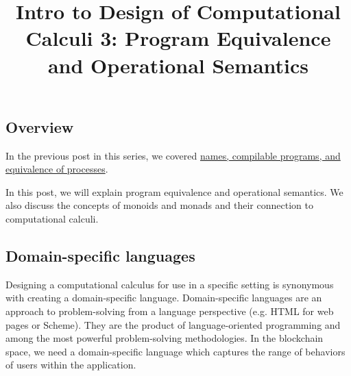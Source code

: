 \documentclass[12pt]{article}
\numberwithin{equation}{section}
\begin{document}
\author{}
\date{}
\title{Intro to Design of Computational Calculi 3: Program Equivalence and Operational Semantics}

\maketitle

\subsection{Overview}
In the previous post in this series, we covered \href{https://blog.rchain.coop/intro-docc-2/}{names, compilable programs, and equivalence of processes}.

In this post, we will explain program equivalence and operational semantics. We also discuss the concepts of monoids and monads and their connection to computational calculi.

\subsection{Domain-specific languages}
Designing a computational calculus for use in a specific setting is synonymous with creating a domain-specific language. Domain-specific languages are an approach to problem-solving from a language perspective (e.g. HTML for web pages or Scheme). They are the product of language-oriented programming and among the most powerful problem-solving methodologies. In the blockchain space, we need a domain-specific language which captures the range of behaviors of users within the application.
\end{document}
